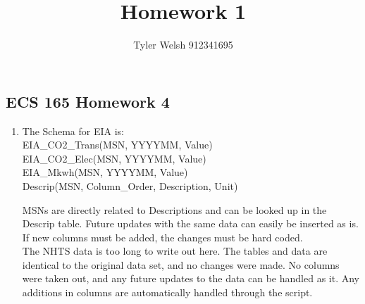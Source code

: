 \documentclass[11pt]{article}  %
\title{\textbf{Homework 1}}
\author{Tyler Welsh 912341695}
\date{}
\begin{document}
\thispagestyle{first}

\begin{center}
\section*{ECS 165 Homework 4}
\end{center}
\normalsize

\begin{enumerate}
\item The Schema for EIA is:\\
EIA\_CO2\_Trans(MSN, YYYYMM, Value)\\
EIA\_CO2\_Elec(MSN, YYYYMM, Value)\\
EIA\_Mkwh(MSN, YYYYMM, Value)\\
Descrip(MSN, Column\_Order, Description, Unit)

MSNs are directly related to Descriptions and can be looked up in the Descrip table. Future updates with the same data can easily be inserted as is. If new columns must be added, the changes must be hard coded.\\

The NHTS data is too long to write out here. The tables and data are identical to the original data set, and no changes were made. No columns were taken out, and any future updates to the data can be handled as it. Any additions in columns are automatically handled through the script.


\end{enumerate}
\end{document}

